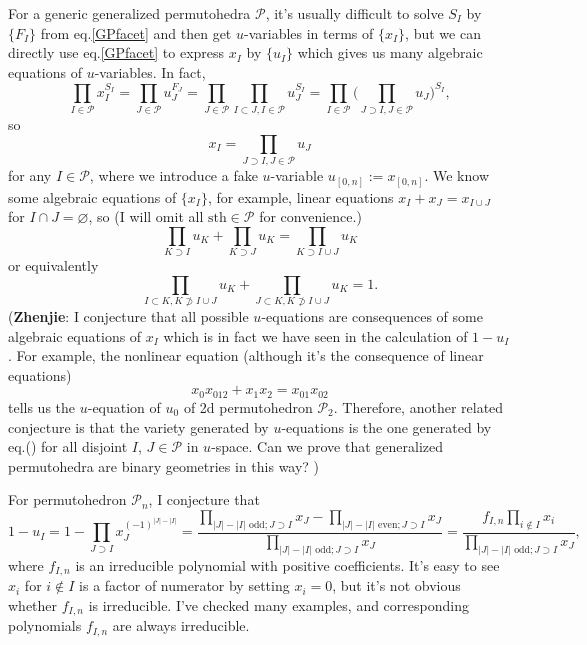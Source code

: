 \documentclass[hidelinks,12pt]{article}
\renewcommand{\theequation}{\thesection.\arabic{equation}}
\renewcommand{\theequation}{\arabic{equation}}
\begin{document}
For a generic generalized permutohedra $\mathscr P$, it's usually difficult to solve $S_I$ by $\{F_I\}$  from eq.\eqref{GPfacet} and then get $u$-variables in terms of $\{x_I\}$, but we can directly use eq.\eqref{GPfacet} to express $x_I$ by $\{u_I\}$ which gives us many algebraic equations of $u$-variables. In fact,
\[
\prod_{I\in \mathscr P}x_I^{S_I}=\prod_{J\in \mathscr P}u_J^{F_J}=\prod_{J\in\mathscr P}\prod_{I\subset J,I\in \mathscr P}u_J^{S_I}=\prod_{I\in\mathscr P}\biggl(\prod_{J\supset I,J\in\mathscr P}u_J\bigg)^{S_I},
\]
so
\[
x_I=\prod_{J\supset I,J\in\mathscr P}u_J
\]
for any $I\in \mathscr P$, where we introduce a fake $u$-variable 
$u_{[0,n]}:=x_{[0,n]}$. We know some algebraic equations of $\{x_I\}$, 
for example, linear equations $x_I+x_J=x_{I\cup J}$ for $I\cap J=\varnothing$, 
so (I will omit all $\text{sth}\in \mathscr P$ for convenience.)
\begin{equation*}
	\prod_{K\supset I}u_K+\prod_{K\supset J}u_K=\prod_{K\supset I\cup J}u_K
\end{equation*}
or equivalently
\begin{equation}
\prod_{I\subset K,K\not\supset I\cup J}u_K +
\prod_{J\subset K,K\not\supset I\cup J}u_K = 1.
\end{equation}
({\bf Zhenjie}: I conjecture that all possible $u$-equations are consequences of 
some algebraic equations of $x_I$ which is in fact we have seen in 
the calculation of $1-u_I$. For example, the nonlinear equation (although it's
the consequence of linear equations)
\[
	x_0x_{012}+x_1x_2=x_{01}x_{02}
\]
tells us the $u$-equation of $u_0$ of 2d permutohedron $\mathscr P_2$. Therefore,
another related conjecture is that the variety generated by $u$-equations 
is the one generated by eq.(\theequation) for all disjoint $I$, $J\in \mathscr P$ 
in $u$-space. Can we prove that generalized permutohedra are binary geometries in
this way?
)

For permutohedron $\mathscr P_n$, I conjecture that
\[
1-u_I=1-\prod_{J\supset I}x_J^{(-1)^{|J|-|I|}}=\frac{\prod_{|J|-|I| \text{ odd}; J\supset I}x_J-\prod_{|J|-|I| \text{ even}; J\supset I}x_J}{\prod_{|J|-|I| \text{ odd}; J\supset I}x_J}
=\frac{f_{I,n}\prod_{i\not\in I}x_i}{\prod_{|J|-|I| \text{ odd}; J\supset I}x_J},
\]
where $f_{I,n}$ is an irreducible polynomial with positive coefficients. It's easy to see $x_i$ for $i\not\in I$ is a factor of numerator by setting $x_i=0$, but it's not obvious whether $f_{I,n}$ is irreducible. I've checked many examples, and corresponding polynomials $f_{I,n}$ are always irreducible.
\end{document}
